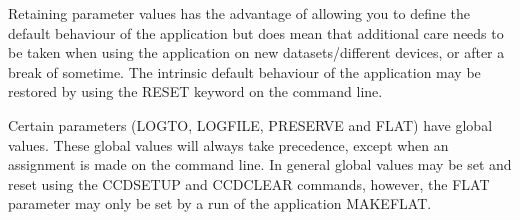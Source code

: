 {{{      }
      Retaining parameter values has the advantage of allowing you to
      define the default behaviour of the application but does mean
      that additional care needs to be taken when using the application
      on new datasets/different devices, or after a break of sometime.
      The intrinsic default behaviour of the application may be
      restored by using the RESET keyword on the command line.

      Certain parameters (LOGTO, LOGFILE, PRESERVE and FLAT) have
      global values. These global values will always take precedence,
      except when an assignment is made on the command line.  In general
      global values may be set and reset using the CCDSETUP and
      CCDCLEAR commands, however, the FLAT parameter may only be set by
      a run of the application MAKEFLAT.
   }
}

